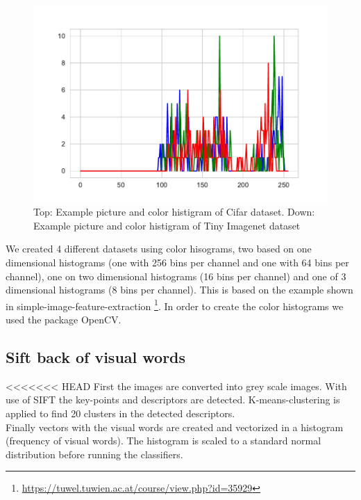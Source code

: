 \documentclass[11pt]{article}
\begin{document}
\begin{figure}[H]
\begin{minipage}[c]{0.4\textwidth}
\end{minipage}
\begin{minipage}[d]{0.6\textwidth}
\includegraphics[width=1\linewidth]{figures/Example_picture_Tiny_Image_hist.pdf}
\end{minipage}
\caption{Top: Example picture and color histigram of Cifar dataset. Down: Example picture and color histigram of Tiny Imagenet dataset}
\label{Example-pictures}
\end{figure}

We created 4 different datasets using color hisograms, two based on one dimensional histograms (one with 256 bins per channel and one with 64 bins per channel), one on two dimensional histograms (16 bins per channel) and one of 3 dimensional histograms (8 bins per channel). This is based on the example shown in simple-image-feature-extraction 
\footnote{\url{https://tuwel.tuwien.ac.at/course/view.php?id=35929}}. In order to create the color histograms we used the package OpenCV. 

\subsection{Sift back of visual words}
<<<<<<< HEAD
First the images are converted into grey scale images. With use of SIFT the key-points and descriptors are detected. K-means-clustering is applied to find 20 clusters in the detected descriptors. \\
Finally vectors with the visual words are created and vectorized in a histogram (frequency of visual words). The histogram is scaled to a standard normal distribution before running the classifiers.   
\end{document}

